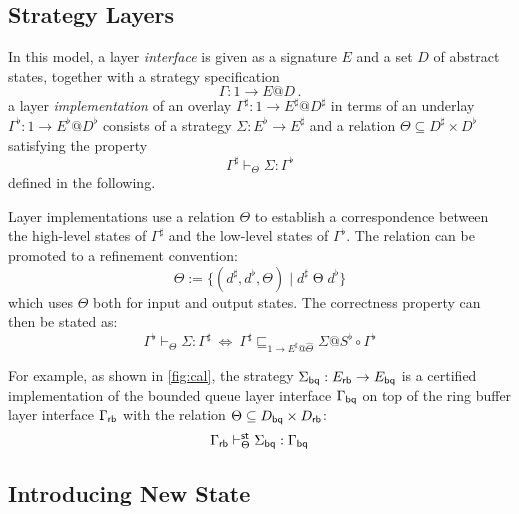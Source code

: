 \documentclass[acmsmall,review,anonymous]{acmart}\settopmatter{printfolios=true,printccs=false,printacmref=false}
\begin{document}
\subsection{Strategy Layers} %
\label{sec:stcal:layer}

In this model,
a layer \emph{interface} is given as
a signature $E$ and
a set $D$ of abstract states,
together with a strategy specification
\[ \Gamma : 1 \rightarrow E@D \,. \]
a layer \emph{implementation}
of an overlay $\Gamma^\sharp : 1 \rightarrow E^\sharp@D^\sharp$
in terms of an underlay
$\Gamma^\flat : 1 \rightarrow E^\flat@D^\flat$
consists of
a strategy $\Sigma : E^\flat \rightarrow E^\sharp$ and
a relation $\Theta \subseteq D^\sharp \times D^\flat$
satisfying the property
\[ \Gamma^\sharp \vdash_\Theta \Sigma : \Gamma^\flat \]
defined in the following.

Layer implementations use a relation $\Theta$
to establish a correspondence between
the high-level states of $\Gamma^\sharp$ and
the low-level states of $\Gamma^\flat$.
The relation can be promoted to a refinement convention:
\[
  \hat{\Theta} := \{ (d^\sharp, d^\flat, \Theta) \mid d^\sharp \mathrel{\Theta} d^\flat \}
\]
which uses $\Theta$ both for
input and output states.
The correctness property can then be stated as:
\[
  \Gamma^\flat \vdash_\Theta \Sigma : \Gamma^\sharp \:\Leftrightarrow\:
  \Gamma^\sharp \sqsubseteq_{1 \rightarrow E^\sharp@\hat{\Theta}} \Sigma@S^\flat \circ \Gamma^\flat
\]

For example,
as shown in \autoref{fig:cal},
the strategy
$\Sigma_{ \mathsf{bq} }: E_{ \mathsf{rb} } \rightarrow E_{ \mathsf{bq} }$
is a certified implementation
of the bounded queue layer interface
$\Gamma_{ \mathsf{bq} }$
on top of the ring buffer layer interface
$\Gamma_{ \mathsf{rb} }$
with the relation
$\Theta \subseteq D_{ \mathsf{bq} } \times D_{ \mathsf{rb} }$:
\[
  \Gamma_{ \mathsf{rb} } \vdash^{ \mathsf{st} }_\Theta \Sigma_{ \mathsf{bq} } : \Gamma_{ \mathsf{bq} }
\]


\subsection{Introducing New State} %
\label{sec:stcal:state}

\end{document}

